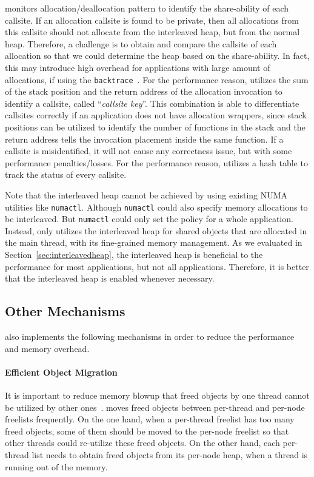 \NM{} monitors allocation/deallocation pattern to identify the share-ability of each callsite. If an allocation callsite is found to be private, then all allocations from this callsite should not allocate from the interleaved heap, but from the normal heap. Therefore, a challenge is to obtain and compare the callsite of each allocation so that we could determine the heap based on the share-ability. In fact, this may introduce high overhead for applications with large amount of allocations, if using the \texttt{backtrace}~\cite{DBLP:conf/icse/SumnerZWZ10, DBLP:conf/cgo/ZengR0AJ014}. For the performance reason, \NA{} utilizes the sum of the stack position and the return address of the allocation invocation to identify a callsite, called ``\textit{callsite key}''. This combination is able to differentiate callsites correctly if an application does not have allocation wrappers, since stack positions can be utilized to identify the number of functions in the stack and the return address tells the invocation placement inside the same function. If a callsite is misidentified, it will not cause any correctness issue, but with some performance penalties/losses. For the performance reason, \NA{} utilizes a hash table to track the status of every callsite. 
 
Note that the interleaved heap cannot be achieved by using existing NUMA utilities like \texttt{numactl}. Although \texttt{numactl} could also specify memory allocations to be interleaved. But \texttt{numactl} could only set the policy for a whole application. Instead, \NM{} only utilizes the interleaved heap for shared objects that are allocated in the main thread, with its fine-grained memory management. As we evaluated in Section~\ref{sec:interleavedheap}, the interleaved heap is beneficial to the performance for most applications, but not all applications.  Therefore, it is better that the interleaved heap is enabled whenever necessary. 

\subsection{Other Mechanisms}
\label{sec:others}

\NM{} also implements the following mechanisms in order to reduce the performance and memory overhead. 

\paragraph{Efficient Object Migration} It is important to reduce memory blowup that freed objects by one thread cannot be utilized by other ones~\cite{Hoard}.  \NM{} moves freed objects between per-thread and per-node freelists frequently. On the one hand, when a per-thread freelist has too many freed objects, some of them should be moved to the per-node freelist so that other threads could re-utilize these freed objects. On the other hand, each per-thread list needs to obtain freed objects from its per-node heap, when a thread is running out of the memory. 

